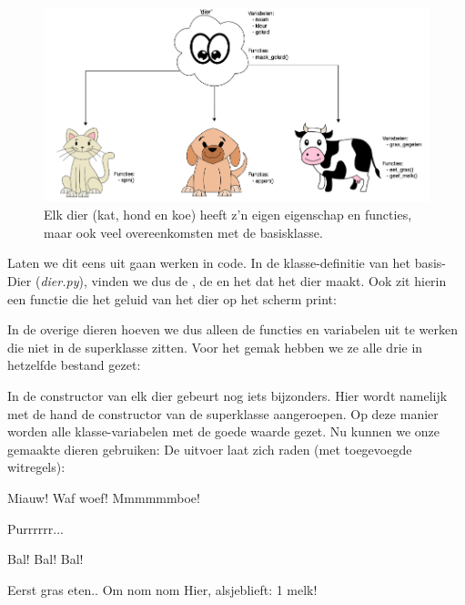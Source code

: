 \begin{figure}[h!]
\centering\includegraphics[scale=0.45]{Pictures/chapter08/animals_inh.png}
  \caption{\small Elk dier (kat, hond en koe) heeft z'n eigen eigenschap en functies, maar ook veel overeenkomsten met de basisklasse.} 
\label{fig:animals2} %
\end{figure}

Laten we dit eens uit gaan werken in code. In de klasse-definitie van het basis-Dier (\textit{dier.py}), vinden we dus de , de  en het  dat het dier maakt. Ook zit hierin een functie  die het geluid van het dier op het scherm print:

\newpage

In de overige dieren hoeven we dus alleen de functies en variabelen uit te werken die niet in de superklasse  zitten. Voor het gemak hebben we ze alle drie in hetzelfde bestand gezet: 

In de constructor van elk dier gebeurt nog iets bijzonders. Hier wordt namelijk met de hand de constructor van de superklasse  aangeroepen. Op deze manier worden alle klasse-variabelen met de goede waarde gezet. Nu kunnen we onze gemaakte dieren gebruiken:
De uitvoer laat zich raden (met toegevoegde witregels):
\begin{python}
Miauw!
Waf woef!
Mmmmmmboe!

Purrrrrr...

Bal! Bal! Bal!

Eerst gras eten..
Om nom nom
Hier, alsjeblieft: 1 melk!
\end{python}

